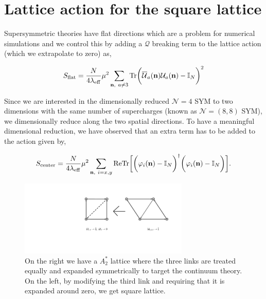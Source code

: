 \section{Lattice action for the square lattice}

Supersymmetric theories have flat directions which are
a problem for numerical simulations and we control this by adding a $\mathcal{Q}$ breaking term to the lattice action (which we extrapolate to zero) as, 

\begin{equation}
  \label{eq:single_trace}
  S_{\text{flat}} = \frac{N}{4\lambda_{\mathrm{eff}}} \mu^2 \sum_{\textbf{n},\ a \neq 3} \mathrm{Tr}{\bigg({\overline{\cal U}}_a(\textbf{n}) \mathcal U_a(\textbf{n}) - \mathbb I_N\bigg)^2}
\end{equation}

Since we are interested in the dimensionally reduced $\mathcal{N} = 4$ SYM to two dimensions with the same number of supercharges 
(known as $\mathcal{N} = (8,8)$ SYM), we dimensionally reduce along the two spatial directions. To have a meaningful dimensional reduction, we have observed that an extra term has to be added to the action given by, 

\begin{equation}
  \label{eq:center}
  S_{\text{center}} = \frac{N}{4\lambda_{\mathrm{eff}}} \mu^2 \sum_{\textbf{n},\ i = x, y} \text{ReTr}\bigg[\bigg(\varphi_i(\textbf{n}) - \mathbb I_N \bigg)^{\dagger}\bigg(\varphi_i(\textbf{n}) - \mathbb I_N \bigg)\bigg].
\end{equation}

\begin{figure}
\begin{center} 
\includegraphics[width=0.72\textwidth]{./Figures/lattice.pdf}
\end{center}
\caption{\label{fig:plot}On the right we have a $A_{2}^{*}$ lattice where the three links are treated equally and expanded symmetrically to 
target the continuum theory. On the left, by modifying the 
third link and requiring that it is expanded around zero, we get square lattice.} 
\end{figure}

